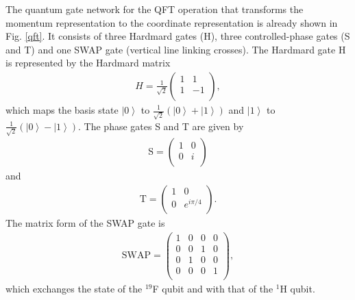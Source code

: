 \documentclass[twocolumn,showpacs,twoside,10pt,prl]{revtex4}
\begin{document}
The quantum gate network for the QFT operation that transforms the momentum representation to the coordinate representation is already shown in Fig. \ref{qft}. It consists of three Hardmard gates (H), three controlled-phase gates (S and T) and one SWAP gate (vertical line linking crosses).
The Hardmard gate H is represented by the Hardmard matrix
\begin{eqnarray}\label{Hardmard}
H = \frac{1}{\sqrt{2}}\left(
  \begin{array}{cc}
    1 & 1 \\
    1 & -1 \\
  \end{array}
\right),
\end{eqnarray}
which maps the basis state $\left\vert 0 \right\rangle$ to $\frac{1}{\sqrt{2}}(\left\vert 0 \right\rangle+\left\vert 1 \right\rangle)$ and $\left\vert 1 \right\rangle$ to $\frac{1}{\sqrt{2}}(\left\vert 0 \right\rangle-\left\vert 1 \right\rangle)$. The phase gates S and T are given by
\begin{eqnarray}\label{phasegate}
\text{S} = \left(
  \begin{array}{cc}
    1 & 0 \\
    0 & i \\
  \end{array}
\right)
\end{eqnarray}
and
\begin{eqnarray}\label{phasegate}
\text{T} = \left(
  \begin{array}{cc}
    1 & 0 \\
    0 & e^{i\pi/4} \\
  \end{array}
\right).
\end{eqnarray}
The matrix form of the SWAP gate is
\begin{eqnarray}\label{SWAP}
\text{SWAP} = \left(
         \begin{array}{cccc}
           1 & 0 & 0 & 0 \\
           0 & 0 & 1 & 0 \\
           0 & 1 & 0 & 0 \\
           0 & 0 & 0 & 1 \\
         \end{array}
       \right),
\end{eqnarray}
which exchanges the state of the $^{19}$F qubit and with that of the $^1$H qubit.
\end{document}
